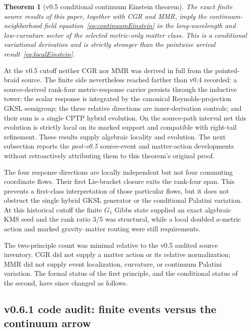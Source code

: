 \documentclass[11pt]{article}
\newtheorem{theorem}{Theorem}[section]
\theoremstyle{definition}
\theoremstyle{remark}
\begin{document}
\begin{theorem}[v0.5 conditional continuum Einstein theorem]\label{thm:conditionalEinstein}
The exact finite source results of this paper, together with CGR and MMR, imply the continuum-neighborhood field equation~\eqref{eq:continuumEinstein} in the long-wavelength and low-curvature sector of the selected metric-only matter class. This is a conditional variational derivation and is strictly stronger than the pointwise arrival result~\eqref{eq:localEinstein}.
\end{theorem}

At the v0.5 cutoff neither CGR nor MMR was derived in full from the pointed-braid source. The finite side nevertheless reached farther than v0.4 recorded: a source-derived rank-four metric-response carrier persists through the inductive tower; the scalar response is integrated by the canonical Reynolds-projection GKSL semigroup; the three relative directions are inner-derivation controls; and their sum is a single CPTP hybrid evolution. On the source-path interval net this evolution is strictly local on its marked support and compatible with right-tail refinement. These results supply algebraic locality and evolution. The next subsection reports the \emph{post-v0.5} source-event and matter-action developments without retroactively attributing them to this theorem's original proof.

The four response directions are locally independent but not four commuting coordinate flows. Their first Lie-bracket closure exits the rank-four span. This prevents a first-class interpretation of those particular flows, but it does not obstruct the single hybrid GKSL generator or the conditional Palatini variation. At this historical cutoff the finite $G_1$ Gibbs state supplied an exact algebraic KMS seed and the rank ratio $3/5$ was structural, while a local doubled $a$-metric action and marked gravity--matter routing were still requirements.

The two-principle count was minimal relative to the v0.5 audited source inventory. CGR did not supply a matter action or its relative normalization; MMR did not supply event localization, curvature, or continuum Palatini variation. The formal status of the first principle, and the conditional status of the second, have since changed as follows.

\subsection{v0.6.1 code audit: finite events versus the continuum arrow}\label{sec:v06events}
\end{document}
